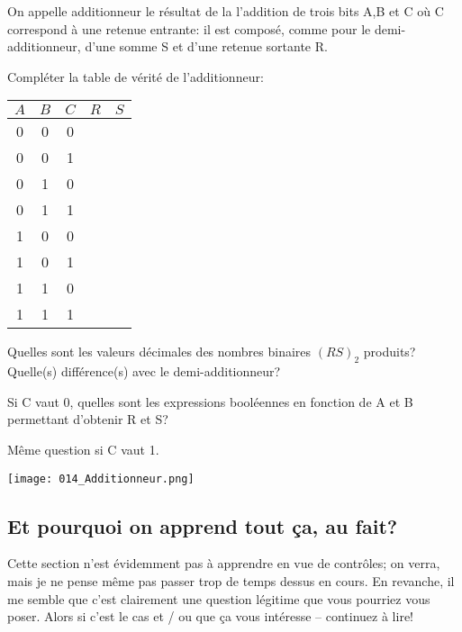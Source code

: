 \documentclass[12pt]{article}
\begin{document}
	\begin{MonExo}
		On appelle additionneur le résultat de la l’addition de trois bits A,B et C où C correspond à une retenue entrante: il est composé, comme pour le demi-additionneur, d’une somme S et d’une retenue sortante R.
		
		\begin{alphenum}
			\item Compléter la table de vérité de l'additionneur:
			\vspace{0.5cm}
			\begin{center}		
				\begin{tabular}{|c|c|c|c|c|}
					\hline
					$A$ & $B$ & $C$ & $R$ & $S$ \\ \hline
					0 & 0 & 0 &  &  \\ \hline
					0 & 0 & 1 &  &  \\ \hline
					0 & 1 & 0 &  &  \\ \hline
					0 & 1 & 1 &  &  \\ \hline
					1 & 0 & 0 & & \\ \hline
					1 & 0 & 1 & & \\ \hline
					1 & 1 & 0 & & \\ \hline
					1 & 1 & 1 & & \\ \hline
				\end{tabular}
			\end{center}
			\vspace{0.5cm}
			
			\item Quelles sont les valeurs décimales des nombres binaires $(RS)_{2}$ produits? Quelle(s) différence(s) avec le demi-additionneur?
			\item Si C vaut 0, quelles sont les expressions booléennes en fonction de A et B permettant d’obtenir R et S?
			\item Même question si C vaut 1.
		\end{alphenum}
	\end{MonExo}
	
		\begin{minipage}{0.95\textwidth}
		\centering
		\texttt{[image: 014\_Additionneur.png]}
	\end{minipage}
	
	\subsection{Et pourquoi on apprend tout ça, au fait?}
	Cette section n'est évidemment pas à apprendre en vue de contrôles; on verra, mais je ne pense même pas passer trop de temps dessus en cours. En revanche, il me semble que c'est clairement une question légitime que vous pourriez vous poser. Alors si c'est le cas et / ou que ça vous intéresse -- continuez à lire!
	
\end{document}
